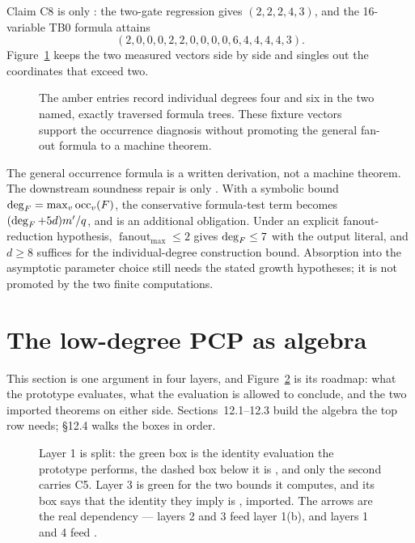 Claim C8 is only : the two-gate regression gives
\((2,2,2,4,3)\), and the 16-variable TB0 formula attains
\[
(2,0,0,0,2,2,0,0,0,0,6,4,4,4,4,3).
\]
Figure~\ref{fig:occurrence-vector} keeps the two measured vectors side by side
and singles out the coordinates that exceed two.
\begin{figure}[t]
\centering

\caption{The amber entries record individual degrees four and six in the two named, exactly traversed formula trees.  These fixture vectors support the occurrence diagnosis without promoting the general fan-out formula to a machine theorem.}
\label{fig:occurrence-vector}
\end{figure}
The general occurrence formula is a written derivation, not a machine theorem.
The downstream soundness repair is only .  With a symbolic
bound \(\operatorname{deg}_F=\max_v\operatorname{occ}_v(F)\), the conservative formula-test
term becomes \((\operatorname{deg}_F+5d)m'/q\), and
 is an additional obligation.  Under an explicit
fanout-reduction hypothesis, \(\operatorname{fanout}_{\max}\leq2\) gives
\(\operatorname{deg}_F\leq7\) with the output literal, and \(d\geq8\) suffices for the
individual-degree construction bound.  Absorption into the asymptotic
parameter choice still needs the stated growth hypotheses; it is not promoted
by the two finite computations.

\section{The low-degree PCP as algebra}

This section is one argument in four layers, and Figure~\ref{fig:four-layers}
is its roadmap: what the prototype evaluates, what the evaluation is allowed to
conclude, and the two imported theorems on either side.  Sections~12.1--12.3
build the algebra the top row needs; \S12.4 walks the boxes in order.
\begin{figure}[t]
\centering

\caption{Layer 1 is split: the green box is the identity evaluation the prototype performs, the dashed box below it is , and only the second carries C5.  Layer 3 is green for the two bounds it computes, and its box says that the identity they imply is , imported.  The arrows are the real dependency --- layers 2 and 3 feed layer 1(b), and layers 1 and 4 feed .}
\label{fig:four-layers}
\end{figure}

